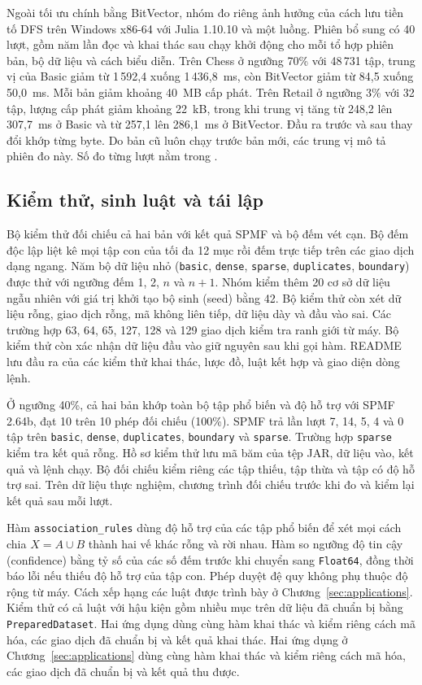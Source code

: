 Ngoài tối ưu chính bằng BitVector, nhóm đo riêng ảnh hưởng của cách
lưu tiền tố DFS trên Windows x86-64 với Julia 1.10.10 và một luồng.
Phiên bổ sung có 40 lượt, gồm năm lần đọc và khai thác sau chạy khởi
động cho mỗi tổ hợp phiên bản, bộ dữ liệu và cách biểu diễn. Trên
Chess ở ngưỡng 70\% với 48\,731 tập, trung vị của Basic giảm từ
1\,592,4 xuống 1\,436,8~ms, còn BitVector giảm từ 84,5 xuống 50,0~ms.
Mỗi bản giảm khoảng 40~MB cấp phát. Trên Retail ở ngưỡng 3\% với 32
tập, lượng cấp phát giảm khoảng 22~kB, trong khi trung vị tăng từ
248,2 lên 307,7~ms ở Basic và từ 257,1 lên 286,1~ms ở BitVector.
Đầu ra trước và sau thay đổi khớp từng byte. Do bản cũ luôn chạy
trước bản mới, các trung vị mô tả phiên đo này.
Số đo từng lượt nằm trong .

\subsection{Kiểm thử, sinh luật và tái lập}
Bộ kiểm thử đối chiếu cả hai bản với kết quả SPMF và bộ đếm vét cạn.
Bộ đếm độc lập liệt kê mọi tập con của tối đa 12 mục rồi đếm trực
tiếp trên các giao dịch dạng ngang. Năm bộ dữ liệu nhỏ
(\texttt{basic}, \texttt{dense}, \texttt{sparse}, \texttt{duplicates},
\texttt{boundary}) được thử với ngưỡng đếm 1, 2, $n$ và $n+1$.
Nhóm kiểm thêm 20 cơ sở dữ liệu ngẫu nhiên với giá trị khởi tạo bộ
sinh (seed) bằng 42. Bộ kiểm thử còn xét dữ liệu rỗng, giao dịch
rỗng, mã không liên tiếp, dữ liệu dày và đầu vào sai.
Các trường hợp 63, 64, 65, 127, 128 và 129 giao dịch kiểm tra ranh
giới từ máy. Bộ kiểm thử còn xác nhận dữ liệu đầu vào giữ nguyên sau
khi gọi hàm. README lưu đầu ra của các kiểm thử khai thác, lược đồ,
luật kết hợp và giao diện dòng lệnh.

Ở ngưỡng 40\%, cả hai bản khớp toàn bộ tập phổ biến và độ hỗ trợ với
SPMF 2.64b, đạt 10 trên 10 phép đối chiếu (100\%). SPMF trả lần lượt
7, 14, 5, 4 và 0 tập trên \texttt{basic}, \texttt{dense},
\texttt{duplicates}, \texttt{boundary} và \texttt{sparse}. Trường hợp
\texttt{sparse} kiểm tra kết quả rỗng. Hồ sơ kiểm thử lưu mã băm của
tệp JAR, dữ liệu vào, kết quả và lệnh chạy. Bộ đối chiếu kiểm riêng
các tập thiếu, tập thừa và tập có độ hỗ trợ sai. Trên dữ liệu thực
nghiệm, chương trình đối chiếu trước khi đo và kiểm lại kết quả sau
mỗi lượt.

Hàm \texttt{association\_rules} dùng độ hỗ trợ của các tập phổ biến để
xét mọi cách chia $X=A\cup B$ thành hai vế khác rỗng và rời nhau. Hàm
so ngưỡng độ tin cậy (confidence) bằng tỷ số của các số đếm trước khi
chuyển sang \texttt{Float64}, đồng thời báo lỗi nếu thiếu độ hỗ trợ
của tập con. Phép duyệt đệ quy không phụ thuộc độ rộng từ máy.
Cách xếp hạng các luật được trình bày ở
Chương~\ref{sec:applications}. Kiểm thử có cả luật với hậu kiện gồm
nhiều mục trên dữ liệu đã chuẩn bị bằng \texttt{PreparedDataset}.
\ifdefined\MemberAOnly
Hai ứng dụng dùng cùng hàm khai thác và kiểm riêng cách mã hóa, các
giao dịch đã chuẩn bị và kết quả khai thác.
\else
Hai ứng dụng ở Chương~\ref{sec:applications} dùng cùng hàm khai thác và
kiểm riêng cách mã hóa, các giao dịch đã chuẩn bị và kết quả thu được.
\fi
